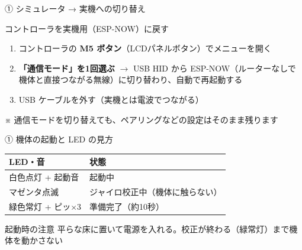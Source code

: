 \begin{frame}{① シミュレータ → 実機への切り替え}
  \begin{block}{コントローラを実機用（ESP-NOW）に戻す}
    \begin{enumerate}\small
      \item コントローラの \textbf{M5 ボタン}（LCDパネルボタン）でメニューを開く
      \item \textbf{「通信モード」を1回選ぶ} $\to$ USB HID から ESP-NOW（ルーターなしで機体と直接つながる無線）に切り替わり、自動で再起動する
      \item USB ケーブルを外す（実機とは電波でつながる）
    \end{enumerate}
  \end{block}

  \vspace{0.3em}

  {\footnotesize ※ 通信モードを切り替えても、ペアリングなどの設定はそのまま残ります}
\end{frame}

\begin{frame}{① 機体の起動と LED の見方}
  \begin{table}
    \centering\small
    \begin{tabular}{ll}
      \hline
      \textbf{LED・音} & \textbf{状態} \\
      \hline
      白色点灯 + 起動音 & 起動中 \\
      マゼンタ点滅 & ジャイロ校正中（機体に触らない） \\
      緑色常灯 + ピッ×3 & 準備完了（約10秒） \\
      \hline
    \end{tabular}
  \end{table}

  \vspace{0.5em}

  \begin{alertblock}{起動時の注意}
    平らな床に置いて電源を入れる。校正が終わる（緑常灯）まで機体を動かさない
  \end{alertblock}
\end{frame}

